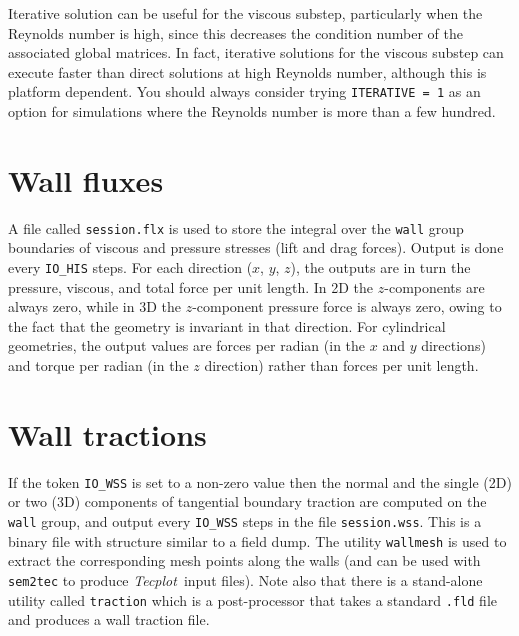 \documentclass[11pt]{report}
\newcommand{\Tecplot}{\emph{Tecplot}}
\begin{document}
Iterative solution can be useful for the viscous substep, particularly
when the Reynolds number is high, since this decreases the condition
number of the associated global matrices.  In fact, iterative
solutions for the viscous substep can execute faster than direct
solutions at high Reynolds number, although this is platform
dependent. You should always consider trying \verb+ITERATIVE = 1+ as
an option for simulations where the Reynolds number is more than a few
hundred.

\section{Wall fluxes}
\label{sec.flux}

A file called \verb+session.flx+ is used to store the integral over
the \verb+wall+ group boundaries of viscous and pressure stresses
(\ie lift and drag forces).  Output is done every \verb+IO_HIS+
steps.  For each direction ($x$, $y$, $z$), the outputs are in turn
the pressure, viscous, and total force per unit length.  In 2D the
$z$-components are always zero, while in 3D the $z$-component pressure
force is always zero, owing to the fact that the geometry is invariant
in that direction.  For cylindrical geometries, the output values are
forces per radian (in the $x$ and $y$ directions) and torque per
radian (in the $z$ direction) rather than forces per unit length.

\section{Wall tractions}
\label{sec.traction}

If the token \verb+IO_WSS+ is set to a non-zero value then the normal
and the single (2D) or two (3D) components of tangential boundary
traction are computed on the \verb+wall+ group, and output every
\verb+IO_WSS+ steps in the file \verb+session.wss+.  This is a binary
file with structure similar to a field dump.  The utility
\verb+wallmesh+ is used to extract the corresponding mesh points along
the walls (and can be used with \verb|sem2tec| to produce
\Tecplot\ input files). Note also that there is a stand-alone utility
called \verb+traction+ which is a post-processor that takes a standard
\verb|.fld| file and produces a wall traction file.

\end{document}
